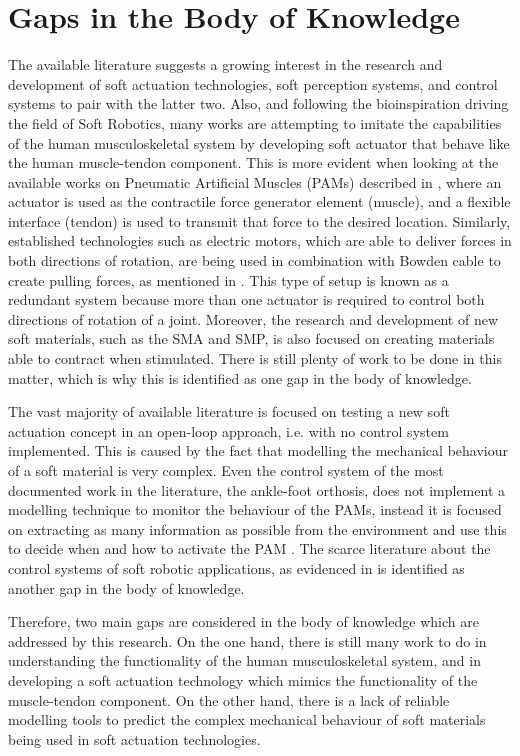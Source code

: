\section{Gaps in the Body of Knowledge} \label{sec:gaps}

The available literature suggests a growing interest in the research and development of soft actuation technologies, soft perception systems, and control systems to pair with the latter two. Also, and following the bioinspiration driving the field of Soft Robotics, many works are attempting to imitate the capabilities of the human musculoskeletal system by developing soft actuator that behave like the human muscle-tendon component. This is more evident when looking at the available works on Pneumatic Artificial Muscles (PAMs) described in , where an actuator is used as the contractile force generator element (muscle), and a flexible interface (tendon) is used to transmit that force to the desired location. Similarly, established technologies such as electric motors, which are able to deliver forces in both directions of rotation, are being used in combination with Bowden cable to create pulling forces, as mentioned in . This type of setup is known as a redundant system because more than one actuator is required to control both directions of rotation of a joint. Moreover, the research and development of new soft materials, such as the SMA and SMP, is also focused on creating materials able to contract when stimulated. There is still plenty of work to be done in this matter, which is why this is identified as one gap in the body of knowledge.

The vast majority of available literature is focused on testing a new soft actuation concept in an open-loop approach, i.e. with no control system implemented. This is caused by the fact that modelling the mechanical behaviour of a soft material is very complex. Even the control system of the most documented work in the literature, the ankle-foot orthosis, does not implement a modelling technique to monitor the behaviour of the PAMs, instead it is focused on extracting as many information as possible from the environment and use this to decide when and how to activate the PAM \cite{park2011bio}. The scarce literature about the control systems of soft robotic applications, as evidenced in  is identified as another gap in the body of knowledge.

Therefore, two main gaps are considered in the body of knowledge which are addressed by this research. On the one hand, there is still many work to do in understanding the functionality of the human musculoskeletal system, and in developing a soft actuation technology which mimics the functionality of the muscle-tendon component. On the other hand, there is a lack of reliable modelling tools to predict the complex mechanical behaviour of soft materials being used in soft actuation technologies. 

